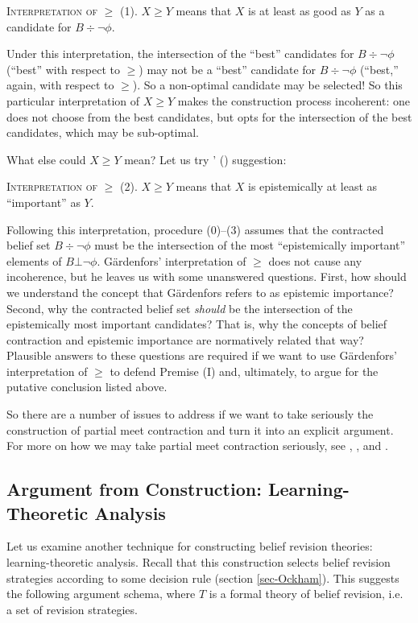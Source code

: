 	\xm \textsc{Interpretation of $\ge$ (1).} $X \ge Y$ means that $X$ is at least as good as $Y$ as a candidate for $B \div \neg\phi$.

\ed Under this interpretation, the intersection of the ``best'' candidates for $B \div \neg\phi$ (``best'' with respect to $\geq$) may not be a ``best'' candidate for $B \div \neg\phi$ (``best,'' again, with respect to $\geq$). So a non-optimal candidate may be selected! So this particular interpretation of $X \ge Y$ makes the construction process incoherent: one does not choose from the best candidates, but opts for the intersection of the best candidates, which may be sub-optimal.  

What else could $X \ge Y$ mean? Let us try \citeauthor{gardenfors1984epistemic}' () suggestion:\op

	\xm \textsc{Interpretation of $\ge$ (2).} $X \ge Y$ means that $X$ is epistemically at least as ``important'' as $Y$.

\ed Following this interpretation, procedure ($0$)--($3$) assumes that the contracted belief set $B \div \neg\phi$ must be the intersection of the most ``epistemically important'' elements of $B\bot\neg\phi$. G\"{a}rdenfors' interpretation of $\ge$ does not cause any incoherence, but he leaves us with some unanswered questions. First, how should we understand the concept that G\"{a}rdenfors refers to as epistemic importance? Second, why the contracted belief set {\em should} be the intersection of the epistemically most important candidates? That is, why the concepts of belief contraction and epistemic importance are normatively related that way? Plausible answers to these questions are required if we want to use G\"{a}rdenfors' interpretation of $\ge$ to defend Premise (I) and, ultimately, to argue for the putative conclusion listed above.


So there are a number of issues to address if we want to take seriously the construction of partial meet contraction and turn it into an explicit argument. For more on how we may take partial meet contraction seriously, see \citet{gardenfors1984epistemic}, \citet{levi2004mild}, and \citet{arlo2006contraction}.


\subsection{Argument from Construction: Learning-Theoretic Analysis}\label{sec-arg-construction-2}

Let us examine another technique for constructing belief revision theories: learning-theoretic analysis. Recall that this construction selects belief revision strategies according to some decision rule (section \ref{sec-Ockham}). This suggests the following argument schema, where $T$ is a formal theory of belief revision, i.e. a set of revision strategies.\op

